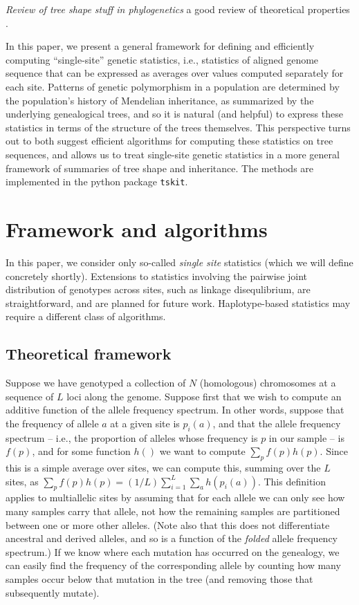 \documentclass{article}
\newcommand{\tskit}{{\texttt{tskit}}}
\newcommand{\plr}[1]{{\color{blue} \it #1}}
\begin{document}
\plr{Review of tree shape stuff in phylogenetics}
a good review of theoretical properties \citet{semple2003phylogenetics}.

In this paper, we present a general framework for defining and efficiently computing
``single-site'' genetic statistics,
i.e., statistics of aligned genome sequence that can be expressed as averages over values computed
separately for each site.
Patterns of genetic polymorphism in a population
are determined by the population's history of Mendelian inheritance,
as summarized by the underlying genealogical trees,
and so it is natural (and helpful) to express these statistics
in terms of the structure of the trees themselves.
This perspective turns out to both suggest efficient algorithms
for computing these statistics on tree sequences,
and allows us to treat single-site genetic statistics in a more general framework
of summaries of tree shape and inheritance.
The methods are implemented in the python package \tskit.


\section*{Framework and algorithms}

In this paper,
we consider only so-called \emph{single site} statistics
(which we will define concretely shortly).
Extensions to statistics involving the pairwise joint distribution of genotypes across sites,
such as linkage disequlibrium,
are straightforward, and are planned for future work.
Haplotype-based statistics may require a different class of algorithms.


\subsection*{Theoretical framework}

Suppose we have genotyped a collection of $N$ (homologous) chromosomes
at a sequence of $L$ loci along the genome.
Suppose first that we wish to compute an additive function of the allele frequency spectrum.
In other words, suppose that the frequency of allele $a$ at a given site is $p_i(a)$,
and that the allele frequency spectrum
-- i.e., the proportion of alleles whose frequency is $p$ in our sample -- is $f(p)$,
and for some function $h()$ we want to compute $\sum_p f(p) h(p)$.
Since this is a simple average over sites,
we can compute this, summing over the $L$ sites, as
$\sum_p f(p) h(p) = (1/L) \sum_{i=1}^L \sum_a h(p_i(a))$.
This definition applies to multiallelic sites by assuming that for each allele
we can only see how many samples carry that allele,
not how the remaining samples are partitioned between one or more other alleles.
(Note also that this does not differentiate ancestral and derived alleles,
and so is a function of the \emph{folded} allele frequency spectrum.)
If we know where each mutation has occurred on the genealogy,
we can easily find the frequency of the corresponding allele by counting how many samples
occur below that mutation in the tree (and removing those that subsequently mutate).
\end{document}
